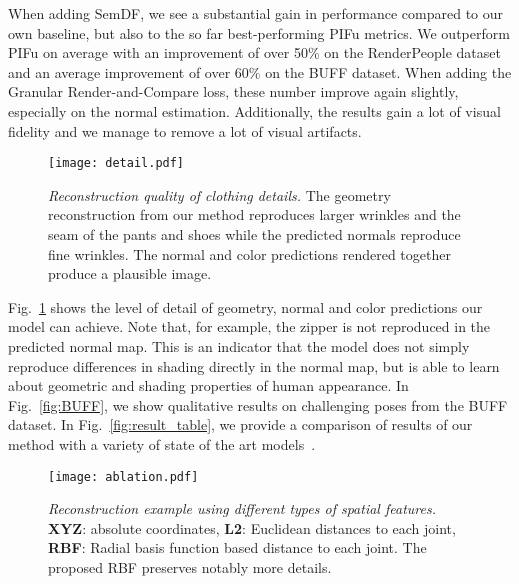 \documentclass[10pt,twocolumn,letterpaper]{article}
\newcommand{\beforefigcaption}{\vspace{-4mm}}
\newcommand{\afterfigcaption}{\vspace{-4mm}}
\begin{document}
When adding SemDF, we see a substantial gain in performance compared to our own baseline, but also to the so far best-performing PIFu metrics. We outperform PIFu on average with an improvement of over 50\% on the RenderPeople dataset and an average improvement of over 60\% on the BUFF dataset. When adding the Granular Render-and-Compare loss, these number improve again slightly, especially on the normal estimation. Additionally, the results gain a lot of visual fidelity and we manage to remove a lot of visual artifacts.

\begin{figure}
\centering
\texttt{[image: detail.pdf]}
\beforefigcaption
\caption{\textit{Reconstruction quality of clothing details.} The geometry reconstruction from our method reproduces larger wrinkles and the seam of the pants and shoes while the predicted normals reproduce fine wrinkles. The normal and color predictions rendered together produce a plausible image.}
\afterfigcaption
\label{fig:local}
\end{figure}

Fig.~\ref{fig:local} shows the level of detail of geometry, normal and color predictions our model can achieve. Note that, for example, the zipper is not reproduced in the predicted normal map. This is an indicator that the model does not simply reproduce differences in shading directly in the normal map, but is able to learn about geometric and shading properties of human appearance.
In Fig.~\ref{fig:BUFF}, we show qualitative results on challenging poses from the BUFF dataset.
In Fig.~\ref{fig:result_table}, we provide a comparison of results of our method with a variety of state of the art models~\cite{varol18_bodynet,kanazawa2018hmr,PIFuICCV19}.

\begin{figure}
\centering
\texttt{[image: ablation.pdf]}
\beforefigcaption
\caption{\textit{Reconstruction example using different types of spatial features.} \textbf{XYZ}: absolute coordinates, 
\textbf{L2}: Euclidean distances to each joint, \textbf{RBF}: Radial basis function based distance to each joint. The proposed RBF preserves notably more details.}
\afterfigcaption
\vspace{3mm}
\label{fig:ablation}
\end{figure}
\end{document}
